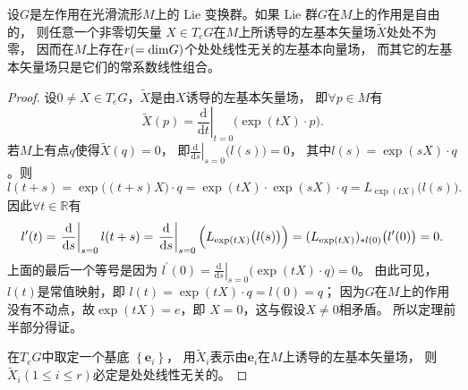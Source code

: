 \begin{theorem}\label{chlg:thm_Liefga}
    设$G$是左作用在光滑流形$M$上的 Lie 变换群。如果 Lie 群$G$在$M$上的作用是自由的，
    则任意一个非零切矢量 $X \in T_e G$在$M$上所诱导的左基本矢量场$\widetilde{X}$处处不为零，
    因而在$M$上存在$r(={\rm dim} G)$个处处线性无关的左基本向量场，
    而其它的左基本矢量场只是它们的常系数线性组合。
\end{theorem} 
\begin{proof}  
    设$0 \neq X \in T_e G$，$\widetilde{X}$是由$X$诱导的左基本矢量场，
    即$\forall p \in M$有
    \begin{equation}
        \widetilde{X}(p)=\left.\frac{\mathrm{d}}{\mathrm{d} t}\right|_{t=0}\bigl(\exp (t X)\cdot p\bigr) .
    \end{equation}
    若$M$上有点$q$使得$\widetilde{X}(q)=0$，
    即$\left.\frac{\mathrm{d}}{\mathrm{d} s}\right|_{s=0}\bigl(l(s) \bigr)=0$，
    其中$l(s)=\exp (s X)\cdot q$。则
    \begin{equation*}
        l(t+s)=\exp \bigl((t+s) X\bigr)\cdot q
        =\exp (t X) \cdot \exp (s X) \cdot q =L_{\exp (t X)}\bigl(l(s)\bigr) .
    \end{equation*}
    因此$\forall t \in \mathbb{R}$有
    \begin{equation*}
        l^{\prime}(t) =\left.\frac{\mathrm{d}}{\mathrm{d} s}\right|_{s=0} l(t+s)
        =\left.\frac{\mathrm{d}}{\mathrm{d} s}\right|_{s=0}\Bigl(L_{\exp (t X)}\bigl(l(s)\bigr)\Bigr) 
        =(L_{\exp (t X)})_{* l(0)}\bigl(l^{\prime}(0)\bigr)=0 .
    \end{equation*}
    上面的最后一个等号是因为
    $l^{\prime}(0)=\left.\frac{\mathrm{d}}{\mathrm{d} s}\right|_{s=0}\bigl(\exp (t X)\cdot q\bigr)=0$。
    由此可见，$l(t)$是常值映射，即
    $l(t)=\exp (t X)\cdot q=l(0)=q $；
    因为$G$在$M$上的作用没有不动点，故$\exp (t X)=e$，即 $X=0$，这与假设$X \neq 0$相矛盾。
    所以定理前半部分得证。
    
    在$T_e G$中取定一个基底 $\left\{\boldsymbol{e}_i\right\}$，
    用$\widetilde{X}_i$表示由$\boldsymbol{e}_i$在$M$上诱导的左基本矢量场，
    则$\widetilde{X}_i (1 \leqslant i \leqslant r)$必定是处处线性无关的。
\end{proof}





